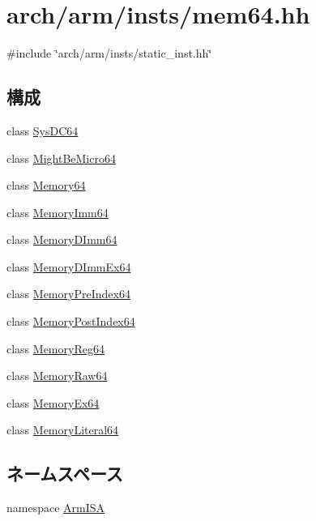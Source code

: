 \hypertarget{mem64_8hh}{
\section{arch/arm/insts/mem64.hh}
\label{mem64_8hh}
}
{\ttfamily \#include \char`\"{}arch/arm/insts/static\_\-inst.hh\char`\"{}}\par
\subsection*{構成}
\begin{DoxyCompactItemize}
\item 
class \hyperlink{classArmISA_1_1SysDC64}{SysDC64}
\item 
class \hyperlink{classArmISA_1_1MightBeMicro64}{MightBeMicro64}
\item 
class \hyperlink{classArmISA_1_1Memory64}{Memory64}
\item 
class \hyperlink{classArmISA_1_1MemoryImm64}{MemoryImm64}
\item 
class \hyperlink{classArmISA_1_1MemoryDImm64}{MemoryDImm64}
\item 
class \hyperlink{classArmISA_1_1MemoryDImmEx64}{MemoryDImmEx64}
\item 
class \hyperlink{classArmISA_1_1MemoryPreIndex64}{MemoryPreIndex64}
\item 
class \hyperlink{classArmISA_1_1MemoryPostIndex64}{MemoryPostIndex64}
\item 
class \hyperlink{classArmISA_1_1MemoryReg64}{MemoryReg64}
\item 
class \hyperlink{classArmISA_1_1MemoryRaw64}{MemoryRaw64}
\item 
class \hyperlink{classArmISA_1_1MemoryEx64}{MemoryEx64}
\item 
class \hyperlink{classArmISA_1_1MemoryLiteral64}{MemoryLiteral64}
\end{DoxyCompactItemize}
\subsection*{ネームスペース}
\begin{DoxyCompactItemize}
\item 
namespace \hyperlink{namespaceArmISA}{ArmISA}
\end{DoxyCompactItemize}
